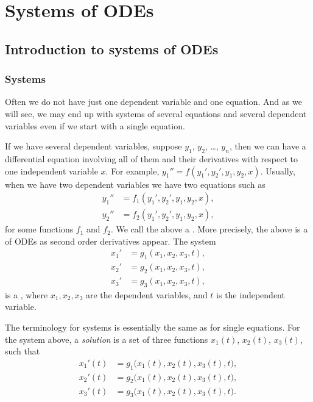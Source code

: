 \chapter{Systems of ODEs} \label{sys:chapter}


\section{Introduction to systems of ODEs} \label{sec:introtosys}


\subsection{Systems}

Often we do not have just one dependent variable and one equation.
And as we will see, we may end up with systems of several
equations and several dependent variables even if we start with a single
equation.

If we have several dependent variables,
suppose $y_1$, $y_2$, \ldots, $y_n$,
then
we can have a differential equation involving all of them and their
derivatives with respect to one independent variable $x$.
For example, $y_1'' = f(y_1',y_2',y_1,y_2,x)$.
Usually, when we have two dependent variables we have two equations
such as
\begin{align*}
y_1'' & = f_1(y_1',y_2',y_1,y_2,x) , \\
y_2'' & = f_2(y_1',y_2',y_1,y_2,x) ,
\end{align*}
for some functions $f_1$ and $f_2$.  We call the above a
\emph{}.
More precisely, the above is a \emph{}
of ODEs as second
order derivatives appear.
The system
\begin{align*}
x_1' & = g_1(x_1,x_2,x_3,t) , \\
x_2' & = g_2(x_1,x_2,x_3,t) , \\
x_3' & = g_3(x_1,x_2,x_3,t) ,
\end{align*}
is a \emph{}, where $x_1,x_2,x_3$ are
the dependent variables,
and $t$ is the independent variable.

The terminology for systems is essentially the same as for
single equations.
For the system above, a
\emph{solution}
is a set of three functions $x_1(t)$, $x_2(t)$, $x_3(t)$, such that
\begin{align*}
x_1'(t) &= g_1\bigl(x_1(t),x_2(t),x_3(t),t\bigr) , \\
x_2'(t) &= g_2\bigl(x_1(t),x_2(t),x_3(t),t\bigr) , \\
x_3'(t) &= g_3\bigl(x_1(t),x_2(t),x_3(t),t\bigr) .
\end{align*}

